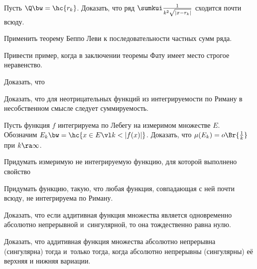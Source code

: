 \documentclass[a4paper]{article}
\begin{document}
\begin{problem}
  Пусть $\Q \bw= \hc{r_k}$. Доказать, что ряд $\sumkui \frac{1}{k^2\sqrt{|x-r_k|}}$ сходится почти всюду.
\end{problem}
\begin{solution}
  Применить теорему Беппо Леви к последовательности частных сумм ряда.
\end{solution}

\begin{problem}
  Привести пример, когда в заключении теоремы Фату имеет место строгое неравенство.
\end{problem}

\begin{problem}
  Доказать, что
\end{problem}

\begin{problem}
  Доказать, что для неотрицательных функций  из интегрируемости по Риману в несобственном смысле
  следует суммируемость.
\end{problem}

\begin{problem}
  Пусть функция $f$ интегрируема по Лебегу на измеримом множестве $E$. Обозначим $E_k\bw=\hc{x\in E\vl k<|f(x)|}$.
  Доказать, что $\mu(E_k)=o\Br{\frac1k}$ при $k\ra\infty$.
\end{problem}

\begin{problem}
  Придумать измеримую не интегрируемую функцию, для которой выполнено свойство
\end{problem}

\begin{problem}
  Придумать функцию, такую, что любая функция, совпадающая с ней почти всюду,
  не интегрируема по Риману.
\end{problem}

\begin{problem}
  Доказать, что если аддитивная функция множества является одновременно абсолютно не\-прерывной
  и~сингулярной, то она тождественно равна нулю.
\end{problem}

\begin{problem}
 Доказать, что аддитивная функция множества абсолютно непрерывна (сингулярна) тогда и~только
 тогда, когда абсолютно непрерывны (сингулярны) её верхняя и нижняя вариации.
\end{problem}
\end{document}
